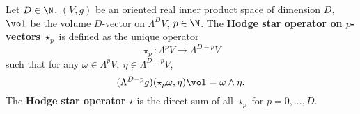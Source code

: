 \begin{definition}
  Let
    $D \in \N$,
    $(V, g)$ be an oriented real inner product space of dimension $D$,
    $\vol$ be the volume $D$-vector on $\Lambda^D V$,
    $p \in \N$.
  The \textbf{Hodge star operator on $p$-vectors} $\star_p$
  is defined as the unique operator
  \begin{equation}
    \star_p \colon \Lambda^p V \to \Lambda^{D - p} V
  \end{equation}
  such that for any $\omega \in \Lambda^p V,\ \eta \in \Lambda^{D - p} V$,
  \begin{equation}
    (\Lambda^{D - p} g)(\star_p \omega, \eta) \vol = \omega \wedge \eta.
  \end{equation}
  The \textbf{Hodge star operator} $\star$ is the direct sum of all $\star_p$
  for $p = 0, ..., D$.
\end{definition}
